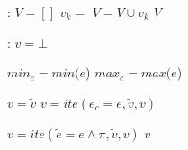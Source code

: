 \documentclass{article}
\begin{document}
\begin{algorithm}
  \begin{algorithmic}[1]
	:
		\State $V = []$ 
			\State $v_k = $ 
			\State $V = V \cup v_k$
		\EndFor
		\State \Return $V$
	\EndFunction
  \end{algorithmic}

  \bigskip

  \begin{algorithmic}[1]
	:
		\State $v = \bot$ 

		\State $min_e = min(e$)
		\State $max_e = max(e$)

				\State ${v} = \widetilde{v}$
			\EndIf
		\Else
					\State $v = ite(e_c = e, \widetilde{v}, v)$
				\EndIf
			\EndFor
		\EndIf

				\State $v = ite(\widetilde{e} = e \wedge \pi, \widetilde{v}, v)$
			\EndIf
		\EndFor
		\State \Return $v$
	\EndFunction
  \end{algorithmic}
  
\end{algorithm}
\end{document}

